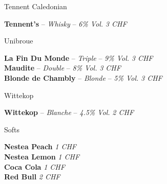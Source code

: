 \documentclass{resume} %
\begin{document}
	\begin{rSection}{Tennent Caledonian}

	{\bf Tennent's} – {\em Whisky } – {\em 6\% Vol.} \hfill {\em 3 CHF} \\

	\end{rSection}

	\begin{rSection}{Unibroue}

	{\bf La Fin Du Monde} – {\em Triple } – {\em 9\% Vol.} \hfill {\em 3 CHF} \\

	{\bf Maudite} – {\em Double } – {\em 8\% Vol.} \hfill {\em 3 CHF} \\

	{\bf Blonde de Chambly} – {\em Blonde } – {\em 5\% Vol.} \hfill {\em 3 CHF} \\

	\end{rSection}

	\begin{rSection}{Wittekop}

	{\bf Wittekop} – {\em Blanche } – {\em 4.5\% Vol.} \hfill {\em 2 CHF} \\

	\end{rSection}

	\newpage
	\begin{rSection}{Softs}

	{\bf Nestea Peach} \hfill {\em 1 CHF} \\

	{\bf Nestea Lemon} \hfill {\em 1 CHF} \\

	{\bf Coca Cola} \hfill {\em 1 CHF} \\

	{\bf Red Bull} \hfill {\em 2 CHF} \\

	\end{rSection}
\end{document}
